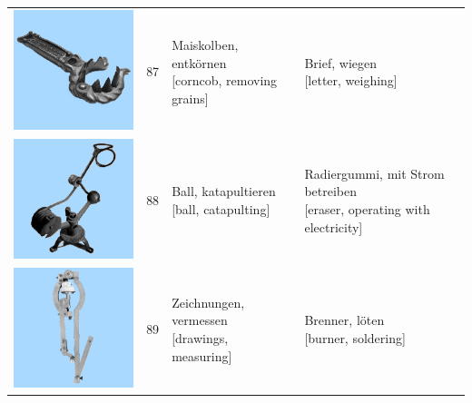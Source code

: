 \documentclass[
  english,
  man,floatsintext]{apa7}
\begin{document}
\begin{center}
\begin{ThreePartTable}
{\begin{longtable}{llll}
\includegraphics[valign=c, scale=0.23]{../materials/unfamiliar/87.png} & 87 & \makecell[l]{Maiskolben, entkörnen\\{[corncob, removing grains]}} & \makecell[l]{Brief, wiegen\\{[letter, weighing]}}\\
\includegraphics[valign=c, scale=0.23]{../materials/unfamiliar/88.png} & 88 & \makecell[l]{Ball, katapultieren\\{[ball, catapulting]}} & \makecell[l]{Radiergummi, mit Strom betreiben\\{[eraser, operating with electricity]}}\\
\includegraphics[valign=c, scale=0.23]{../materials/unfamiliar/89.png} & 89 & \makecell[l]{Zeichnungen, vermessen\\{[drawings, measuring]}} & \makecell[l]{Brenner, löten\\{[burner, soldering]}}\\

\end{longtable}}
\end{ThreePartTable}
\end{center}
\end{document}
